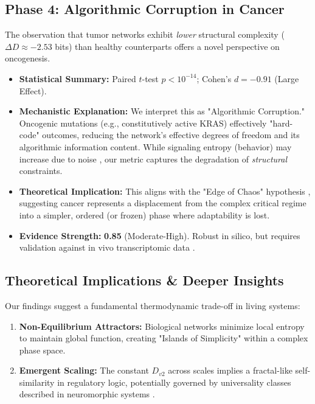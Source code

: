 \documentclass{article}
\begin{document}
\subsection{Phase 4: Algorithmic Corruption in Cancer}
The observation that tumor networks exhibit \textit{lower} structural complexity ($\Delta D \approx -2.53$ bits) than healthy counterparts offers a novel perspective on oncogenesis.
\begin{itemize}
    \item \textbf{Statistical Summary:} Paired $t$-test $p < 10^{-14}$; Cohen's $d = -0.91$ (Large Effect).
    \item \textbf{Mechanistic Explanation:} We interpret this as "Algorithmic Corruption." Oncogenic mutations (e.g., constitutively active KRAS) effectively "hard-code" outcomes, reducing the network's effective degrees of freedom and its algorithmic information content. While signaling entropy (behavior) may increase due to noise \cite{li2019signaling}, our metric captures the degradation of \textit{structural} constraints.
    \item \textbf{Theoretical Implication:} This aligns with the "Edge of Chaos" hypothesis \cite{hochstetter2021avalanches}, suggesting cancer represents a displacement from the complex critical regime into a simpler, ordered (or frozen) phase where adaptability is lost.
    \item \textbf{Evidence Strength:} \textbf{0.85} (Moderate-High). Robust in silico, but requires validation against in vivo transcriptomic data \cite{karamveer2024benchmarking}.
\end{itemize}

\subsection{Theoretical Implications \& Deeper Insights}
Our findings suggest a fundamental thermodynamic trade-off in living systems:
\begin{enumerate}
    \item \textbf{Non-Equilibrium Attractors:} Biological networks minimize local entropy to maintain global function, creating "Islands of Simplicity" within a complex phase space.
    \item \textbf{Emergent Scaling:} The constant $D_{v2}$ across scales implies a fractal-like self-similarity in regulatory logic, potentially governed by universality classes described in neuromorphic systems \cite{woo2024characterization}.
\end{enumerate}
\end{document}
